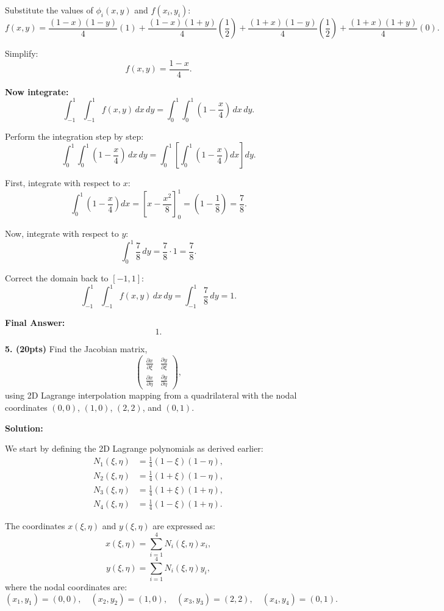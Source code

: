 \documentclass[11pt]{article}
\begin{document}
Substitute the values of \(\phi_i(x, y)\) and \(f(x_i, y_i)\):
\[
f(x, y) = \frac{(1 - x)(1 - y)}{4}(1) + \frac{(1 - x)(1 + y)}{4}\left(\frac{1}{2}\right) + \frac{(1 + x)(1 - y)}{4}\left(\frac{1}{2}\right) + \frac{(1 + x)(1 + y)}{4}(0).
\]

Simplify:
\[
f(x, y) = \frac{1 - x}{4}.
\]

\textbf{Now integrate:}
\[
\int_{-1}^1 \int_{-1}^1 f(x, y) \, dx \, dy = \int_0^1 \int_0^1 \left(1 - \frac{x}{4}\right) \, dx \, dy.
\]

Perform the integration step by step:
\[
\int_0^1 \int_0^1 \left(1 - \frac{x}{4}\right) \, dx \, dy = \int_0^1 \left[\int_0^1 \left(1 - \frac{x}{4}\right) dx \right] dy.
\]

First, integrate with respect to \(x\):
\[
\int_0^1 \left(1 - \frac{x}{4}\right) dx = \left[x - \frac{x^2}{8}\right]_0^1 = \left(1 - \frac{1}{8}\right) = \frac{7}{8}.
\]

Now, integrate with respect to \(y\):
\[
\int_0^1 \frac{7}{8} \, dy = \frac{7}{8} \cdot 1 = \frac{7}{8}.
\]

Correct the domain back to \([-1, 1]\):
\[
\int_{-1}^1 \int_{-1}^1 f(x, y) \, dx \, dy = \int_{-1}^1 \frac{7}{8} \, dy = 1.
\]

\textbf{Final Answer:} 
\[
\boxed{1}.
\]


\textbf{5. (20pts)} Find the Jacobian matrix,
\[
\begin{pmatrix}
\frac{\partial x}{\partial \xi} & \frac{\partial y}{\partial \xi} \\
\frac{\partial x}{\partial \eta} & \frac{\partial y}{\partial \eta}
\end{pmatrix},
\]
using 2D Lagrange interpolation mapping from a quadrilateral with the nodal coordinates \((0,0)\), \((1,0)\), \((2,2)\), and \((0,1)\).

\textbf{Solution:}

We start by defining the 2D Lagrange polynomials as derived earlier:
\[
\begin{aligned}
N_1(\xi, \eta) &= \frac{1}{4}(1-\xi)(1-\eta), \\
N_2(\xi, \eta) &= \frac{1}{4}(1+\xi)(1-\eta), \\
N_3(\xi, \eta) &= \frac{1}{4}(1+\xi)(1+\eta), \\
N_4(\xi, \eta) &= \frac{1}{4}(1-\xi)(1+\eta).
\end{aligned}
\]

The coordinates \(x(\xi, \eta)\) and \(y(\xi, \eta)\) are expressed as:
\[
x(\xi, \eta) = \sum_{i=1}^4 N_i(\xi, \eta) x_i,
\]
\[
y(\xi, \eta) = \sum_{i=1}^4 N_i(\xi, \eta) y_i,
\]
where the nodal coordinates are:
\[
(x_1, y_1) = (0, 0), \quad (x_2, y_2) = (1, 0), \quad (x_3, y_3) = (2, 2), \quad (x_4, y_4) = (0, 1).
\]
\end{document}
